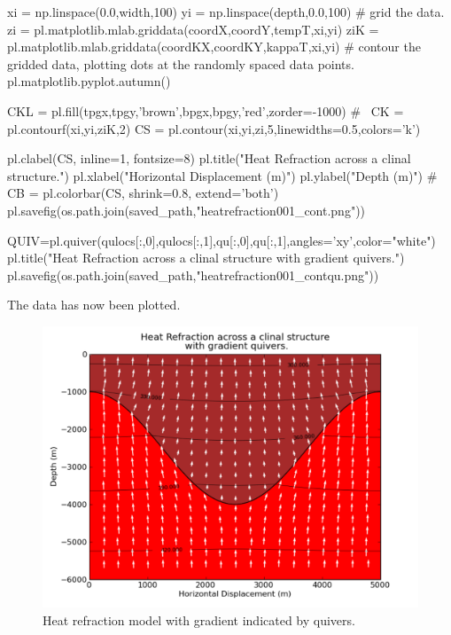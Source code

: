 \begin{python}
xi = np.linspace(0.0,width,100)
yi = np.linspace(depth,0.0,100)
# grid the data.
zi = pl.matplotlib.mlab.griddata(coordX,coordY,tempT,xi,yi)
ziK = pl.matplotlib.mlab.griddata(coordKX,coordKY,kappaT,xi,yi)
# contour the gridded data, plotting dots at the randomly spaced data points.
pl.matplotlib.pyplot.autumn()

CKL = pl.fill(tpgx,tpgy,'brown',bpgx,bpgy,'red',zorder=-1000)
#~ CK = pl.contourf(xi,yi,ziK,2)
CS = pl.contour(xi,yi,zi,5,linewidths=0.5,colors='k')

pl.clabel(CS, inline=1, fontsize=8)
pl.title("Heat Refraction across a clinal structure.")
pl.xlabel("Horizontal Displacement (m)")
pl.ylabel("Depth (m)")
#~ CB = pl.colorbar(CS, shrink=0.8, extend='both')
pl.savefig(os.path.join(saved_path,"heatrefraction001_cont.png"))

QUIV=pl.quiver(qulocs[:,0],qulocs[:,1],qu[:,0],qu[:,1],angles='xy',color="white")
pl.title("Heat Refraction across a clinal structure \n with gradient quivers.")
pl.savefig(os.path.join(saved_path,"heatrefraction001_contqu.png"))
\end{python} 
The data has now been plotted.
\begin{figure}[ht]
\centerline{\includegraphics[width=4.in]{figures/heatrefraction001contqu}}
\caption{Heat refraction model with gradient indicated by quivers.}
\label{fig:hr001qumodel}
\end{figure}

\newpage
